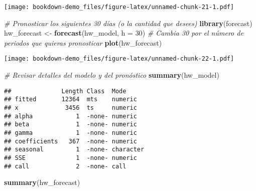 \documentclass[
]{book}
\newenvironment{Shaded}{\begin{snugshade}}{\end{snugshade}}
\newcommand{\AttributeTok}[1]{\textcolor[rgb]{0.13,0.29,0.53}{#1}}
\newcommand{\CommentTok}[1]{\textcolor[rgb]{0.56,0.35,0.01}{\textit{#1}}}
\newcommand{\DecValTok}[1]{\textcolor[rgb]{0.00,0.00,0.81}{#1}}
\newcommand{\FunctionTok}[1]{\textcolor[rgb]{0.13,0.29,0.53}{\textbf{#1}}}
\newcommand{\NormalTok}[1]{#1}
\newcommand{\OtherTok}[1]{\textcolor[rgb]{0.56,0.35,0.01}{#1}}
\begin{document}
\texttt{[image: bookdown-demo\_files/figure-latex/unnamed-chunk-21-1.pdf]}

\begin{Shaded}
\begin{Highlighting}[]
\CommentTok{\# Pronosticar los siguientes 30 días (o la cantidad que desees)}
\FunctionTok{library}\NormalTok{(forecast)}
\NormalTok{hw\_forecast }\OtherTok{\textless{}{-}} \FunctionTok{forecast}\NormalTok{(hw\_model, }\AttributeTok{h =} \DecValTok{30}\NormalTok{)  }\CommentTok{\# Cambia 30 por el número de periodos que quieras pronosticar}
\FunctionTok{plot}\NormalTok{(hw\_forecast)}
\end{Highlighting}
\end{Shaded}

\texttt{[image: bookdown-demo\_files/figure-latex/unnamed-chunk-22-1.pdf]}

\begin{Shaded}
\begin{Highlighting}[]
\CommentTok{\# Revisar detalles del modelo y del pronóstico}
\FunctionTok{summary}\NormalTok{(hw\_model)}
\end{Highlighting}
\end{Shaded}

\begin{verbatim}
##              Length Class  Mode     
## fitted       12364  mts    numeric  
## x             3456  ts     numeric  
## alpha            1  -none- numeric  
## beta             1  -none- numeric  
## gamma            1  -none- numeric  
## coefficients   367  -none- numeric  
## seasonal         1  -none- character
## SSE              1  -none- numeric  
## call             2  -none- call
\end{verbatim}

\begin{Shaded}
\begin{Highlighting}[]
\FunctionTok{summary}\NormalTok{(hw\_forecast)}
\end{Highlighting}
\end{Shaded}
\end{document}
